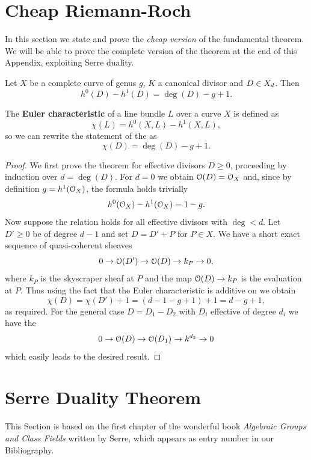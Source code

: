\section{Cheap Riemann-Roch}
	In this section we state and prove the \emph{cheap version} of the fundamental \RR theorem. We will be able to prove the complete version of the theorem at the end of this Appendix, exploiting Serre duality.
	\begin{namedtheo}\label{thm:cheap_RR}
		Let $X$ be a complete curve of genus $g$, $K$ a canonical divisor and $D\in X_d$. Then
		$$ h^0(D) - h^1(D) = \deg(D)-g+1. $$
	\end{namedtheo}
	\begin{rema}
		The \textbf{Euler characteristic} of a line bundle $L$ over a curve $X$ is defined as
		$$ \chi(L) = h^0(X,L) - h^1(X,L), $$
		so we can rewrite the statement of the \RR as
		$$ \chi(D) = \deg(D) - g + 1. $$
	\end{rema}
	\begin{proof}
		We first prove the theorem for effective divisors $D\geq 0$, proceeding by induction over $d=\deg(D)$. For $d=0$ we obtain $\mathcal{O}(D)=\mathcal{O}_X$ and, since by definition $g=h^1(\mathcal{O}_X)$, the formula holds trivially
		$$ h^0(\mathcal{O}_X) - h^1(\mathcal{O}_X) = 1-g. $$
		Now suppose the relation holds for all effective divisors with $\deg<d$. Let $D'\geq 0$ be of degree $d-1$ and set $D=D'+P$ for $P\in X$. We have a short exact sequence of quasi-coherent sheaves
		$$ 0 \to \mathcal{O}(D') \to \mathcal{O}(D) \to k_P \to 0, $$
		where $k_P$ is the skyscraper sheaf at $P$ and the map ${\mathcal{O}(D)}\to{k_P}$ is the evaluation at $P$. Thus using the fact that the Euler characteristic is additive on \sess we obtain
		$$ \chi(D) = \chi(D') + 1 = (d-1-g+1) + 1 = d-g+1, $$
		as required. For the general case $D=D_1-D_2$ with $D_i$ effective of degree $d_i$ we have the \ses
		$$ 0 \to \mathcal{O}(D) \to \mathcal{O}(D_1) \to k^{d_2} \to 0 $$
		which easily leads to the desired result.
	\end{proof}

\section{Serre Duality Theorem}\label{sec:Serre_duality}

	This Section is based on the first chapter of the wonderful book \emph{Algebraic Groups and Class Fields} written by Serre, which appears as entry number \cite{SERRE} in our Bibliography.\\

